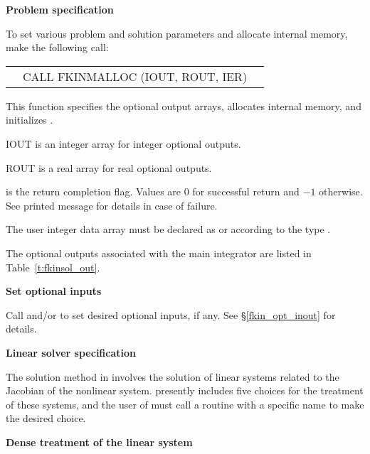 \begin{Steps}
\item {\bf Problem specification}

  To set various problem and solution parameters and allocate
  internal memory, make the following call:
  {
    \begin{tabular}[t]{@{}r@{}l@{}l@{}}
        &CALL FKINMALLOC (IOUT, ROUT, IER)
    \end{tabular}
  }
  {
    This function specifies the optional output arrays,
    allocates internal memory, and initializes {\kinsol}.
  }
  {
    \begin{args}[IOUT\,]
    \item[IOUT] is an integer array for integer optional outputs.
    \item[ROUT] is a real array for real optional outputs.
    \end{args}
  }
  {
     is the return completion flag. Values are $0$ for successful return
    and $-1$ otherwise. See printed message for details in case of failure.
  }
  {
    The user integer data array  must be declared as  or
     according to the {\C} type .

    The optional outputs associated with the main {\kinsol} integrator
    are listed in Table~\ref{t:fkinsol_out}.
  }

\item\label{i:fkinsol_opt_input}{\bf Set optional inputs} 

  Call  and/or  to set desired optional inputs,
  if any.  See \S\ref{fkin_opt_inout} for details.

\item\label{i:fkinsol_lin_solv_spec}{\bf Linear solver specification} 

  The solution method in {\kinsol} involves the solution of linear systems 
  related to the Jacobian of the nonlinear system. {\kinsol} presently
  includes five choices for the treatment of these systems, and the user of
  {\fkinsol} must call a routine with a specific name to make the desired
  choice.


  {\s} {\bf Dense treatment of the linear system}
  

\end{Steps}

